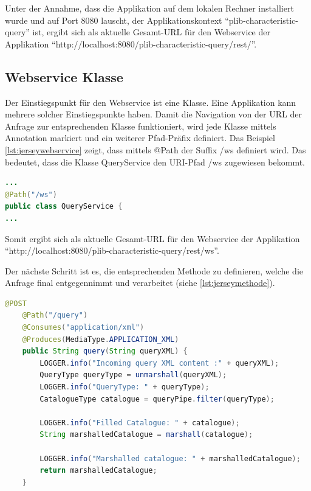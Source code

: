 Unter der Annahme, dass die Applikation auf dem lokalen Rechner installiert wurde und auf Port 8080 lauscht, der \gls{Applikationskontext} \enquote{plib-characteristic-query} ist, ergibt sich als aktuelle Gesamt-URL für den \gls{Webservice} der Applikation \enquote{http://localhost:8080/plib-characteristic-query/rest/}.
 

\subsection{Webservice Klasse}
Der Einstiegspunkt für den \gls{Webservice} ist eine Klasse. Eine Applikation kann mehrere solcher Einstiegspunkte haben. Damit die Navigation von der \gls{URL} der Anfrage zur entsprechenden Klasse funktioniert, wird jede Klasse mittels Annotation markiert und ein weiterer Pfad-Präfix definiert. Das Beispiel 
\autoref{lst:jerseywebservice} zeigt, dass mittels @Path der Suffix /ws definiert wird. Das bedeutet, dass die Klasse QueryService den \gls{URI}-Pfad /ws zugewiesen bekommt. 
  \begin{lstlisting}[caption=Jersey Webservice Klasse, language=Java, label=lst:jerseywebservice]
...
@Path("/ws")
public class QueryService {
...
 \end{lstlisting}  
 
Somit ergibt sich als aktuelle Gesamt-\gls{URL} für den \gls{Webservice} der Applikation \\  \enquote{http://localhost:8080/plib-characteristic-query/rest/ws}.
 
Der nächste Schritt ist es, die entsprechenden Methode zu definieren, welche die Anfrage final entgegennimmt und verarbeitet (siehe \autoref{lst:jerseymethode}). 
 
  \begin{lstlisting}[caption=Jersey Methode, language=Java, label=lst:jerseymethode]
    @POST
    @Path("/query")
    @Consumes("application/xml")
    @Produces(MediaType.APPLICATION_XML)
    public String query(String queryXML) {
        LOGGER.info("Incoming query XML content :" + queryXML);
        QueryType queryType = unmarshall(queryXML);
        LOGGER.info("QueryType: " + queryType);
        CatalogueType catalogue = queryPipe.filter(queryType);

        LOGGER.info("Filled Catalogue: " + catalogue);
        String marshalledCatalogue = marshall(catalogue);

        LOGGER.info("Marshalled catalogue: " + marshalledCatalogue);
        return marshalledCatalogue;
    }
 \end{lstlisting}  

